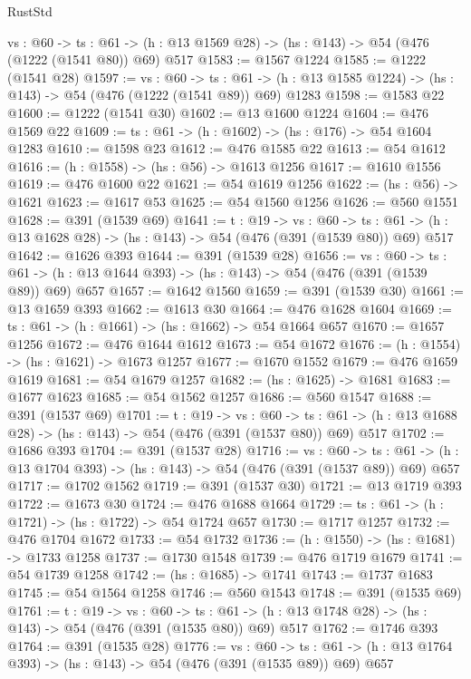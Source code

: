 \begin{lexlean}{RustStd}
\begin{coremodule}
  {vs : @60} ->
  {ts : @61} -> (h : @13 @1569 @28) -> (hs : @143) -> @54 (@476 (@1222 (@1541 @80)) @69) @517
@1583 := @1567 @1224
@1585 := @1222 (@1541 @28)
@1597 := {vs : @60} ->
  {ts : @61} -> (h : @13 @1585 @1224) -> (hs : @143) -> @54 (@476 (@1222 (@1541 @89)) @69) @1283
@1598 := @1583 @22
@1600 := @1222 (@1541 @30)
@1602 := @13 @1600 @1224
@1604 := @476 @1569 @22
@1609 := {ts : @61} -> (h : @1602) -> (hs : @176) -> @54 @1604 @1283
@1610 := @1598 @23
@1612 := @476 @1585 @22
@1613 := @54 @1612
@1616 := (h : @1558) -> (hs : @56) -> @1613 @1256
@1617 := @1610 @1556
@1619 := @476 @1600 @22
@1621 := @54 @1619 @1256
@1622 := (hs : @56) -> @1621
@1623 := @1617 @53
@1625 := @54 @1560 @1256
@1626 := @560 @1551
@1628 := @391 (@1539 @69)
@1641 := {t : @19} ->
  {vs : @60} ->
  {ts : @61} -> (h : @13 @1628 @28) -> (hs : @143) -> @54 (@476 (@391 (@1539 @80)) @69) @517
@1642 := @1626 @393
@1644 := @391 (@1539 @28)
@1656 := {vs : @60} ->
  {ts : @61} -> (h : @13 @1644 @393) -> (hs : @143) -> @54 (@476 (@391 (@1539 @89)) @69) @657
@1657 := @1642 @1560
@1659 := @391 (@1539 @30)
@1661 := @13 @1659 @393
@1662 := @1613 @30
@1664 := @476 @1628 @1604
@1669 := {ts : @61} -> (h : @1661) -> (hs : @1662) -> @54 @1664 @657
@1670 := @1657 @1256
@1672 := @476 @1644 @1612
@1673 := @54 @1672
@1676 := (h : @1554) -> (hs : @1621) -> @1673 @1257
@1677 := @1670 @1552
@1679 := @476 @1659 @1619
@1681 := @54 @1679 @1257
@1682 := (hs : @1625) -> @1681
@1683 := @1677 @1623
@1685 := @54 @1562 @1257
@1686 := @560 @1547
@1688 := @391 (@1537 @69)
@1701 := {t : @19} ->
  {vs : @60} ->
  {ts : @61} -> (h : @13 @1688 @28) -> (hs : @143) -> @54 (@476 (@391 (@1537 @80)) @69) @517
@1702 := @1686 @393
@1704 := @391 (@1537 @28)
@1716 := {vs : @60} ->
  {ts : @61} -> (h : @13 @1704 @393) -> (hs : @143) -> @54 (@476 (@391 (@1537 @89)) @69) @657
@1717 := @1702 @1562
@1719 := @391 (@1537 @30)
@1721 := @13 @1719 @393
@1722 := @1673 @30
@1724 := @476 @1688 @1664
@1729 := {ts : @61} -> (h : @1721) -> (hs : @1722) -> @54 @1724 @657
@1730 := @1717 @1257
@1732 := @476 @1704 @1672
@1733 := @54 @1732
@1736 := (h : @1550) -> (hs : @1681) -> @1733 @1258
@1737 := @1730 @1548
@1739 := @476 @1719 @1679
@1741 := @54 @1739 @1258
@1742 := (hs : @1685) -> @1741
@1743 := @1737 @1683
@1745 := @54 @1564 @1258
@1746 := @560 @1543
@1748 := @391 (@1535 @69)
@1761 := {t : @19} ->
  {vs : @60} ->
  {ts : @61} -> (h : @13 @1748 @28) -> (hs : @143) -> @54 (@476 (@391 (@1535 @80)) @69) @517
@1762 := @1746 @393
@1764 := @391 (@1535 @28)
@1776 := {vs : @60} ->
  {ts : @61} -> (h : @13 @1764 @393) -> (hs : @143) -> @54 (@476 (@391 (@1535 @89)) @69) @657

\end{coremodule}
\end{lexlean}
